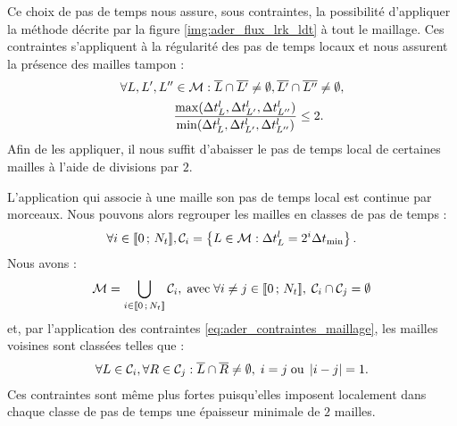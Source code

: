 Ce choix de pas de temps nous assure, sous contraintes,
la possibilité d'appliquer la méthode décrite par la figure
\ref{img:ader_flux_lrk_ldt} à tout le maillage.
Ces contraintes s'appliquent à la régularité des pas de temps locaux
et nous assurent la présence des mailles tampon :
\begin{equation}
	\begin{aligned}
		\forall L, L', L'' &\in \mathcal{M} :
		\overline{L} \cap \overline{L'} \neq \emptyset ,
		\overline{L'} \cap \overline{L''} \neq \emptyset , \\
		&\frac{\max(\Delta t_L^l,\Delta t_{L'}^l,\Delta t_{L''}^l)}
		{\min(\Delta t_L^l,\Delta t_{L'}^l,\Delta t_{L''}^l)} \le 2
		\label{eq:ader_contraintes_maillage} .
	\end{aligned}
\end{equation}
Afin de les appliquer, il nous suffit d'abaisser le pas de temps local
de certaines mailles à l'aide de divisions par $2$.

L'application qui associe à une maille son pas de temps local
est continue par morceaux.
Nous pouvons alors regrouper les mailles en classes de pas de temps :
\begin{align} \label{eq:lts2_classes}
	\forall i \in \lbrack\!\lbrack0\,;\,N_t\rbrack\!\rbrack , 
	\mathcal{C}_i = \left\lbrace L \in \mathcal{M} : 
		\Delta t_L^l = 2^i \Delta t_{\min}
		\right\rbrace .
\end{align}
Nous avons :
\begin{align}
	\mathcal{M} = \bigcup_{i \in \lbrack\!\lbrack0\,;\,N_t\rbrack\!\rbrack} \mathcal{C}_i , \; \mathrm{avec} \;
	\forall i \neq j \in \lbrack\!\lbrack0\,;\,N_t\rbrack\!\rbrack, \; \mathcal{C}_i \cap \mathcal{C}_j = \emptyset
\end{align}
et, par l'application des contraintes \eqref{eq:ader_contraintes_maillage},
les mailles voisines sont classées telles que :
\begin{align}
	\forall L \in \mathcal{C}_i,
	\forall R \in \mathcal{C}_j :
	\overline{L} \cap \overline{R} \neq \emptyset , \;
	i = j \; \mathrm{ou} \; \left\vert i - j\right\vert = 1 .
\end{align}
Ces contraintes sont même plus fortes puisqu'elles imposent localement
dans chaque classe de pas de temps une épaisseur minimale de $2$ mailles.

